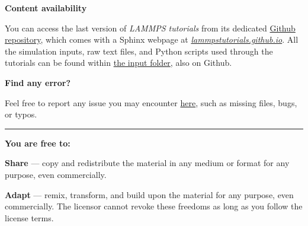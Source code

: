 \thispagestyle{empty}
\setcounter{page}{0}



\vspace{1.5cm}


\noindent \textbf{\large Content availability}

\vspace{0.5cm}

\noindent You can access the last version of \emph{LAMMPS tutorials} from its dedicated \href{https://github.com/lammpstutorials/lammpstutorials.github.io}{Github repository}, which comes with a Sphinx webpage at \href{https://lammpstutorials.github.io/}{\emph{lammpstutorials.github.io}}. All the simulation inputs, raw text files, and Python scripts used through the tutorials can be found within \href{https://github.com/lammpstutorials/lammpstutorials.github.io/tree/version2.0/docs/inputs}{the input folder}, also on Github.

\vspace{0.5cm}

\noindent \textbf{\large Find any error?}

\vspace{0.5cm}

\noindent Feel free to report any issue you may encounter \href{https://github.com/lammpstutorials/lammpstutorials.github.io/issues}{here}, such as missing files, bugs, or typos.

\vspace{4cm}

\par\noindent\rule{\textwidth}{0.5pt}

\doclicenseThis

\vspace{0.5cm}

\noindent \textbf{\large You are free to:}

\vspace{0.25cm}

\noindent  \textbf{Share} — copy and redistribute the material in any medium or format for any purpose, even commercially.

\vspace{0.1cm}

\noindent  \textbf{Adapt} — remix, transform, and build upon the material for any purpose, even commercially. The licensor cannot revoke these freedoms as long as you follow the license terms.

